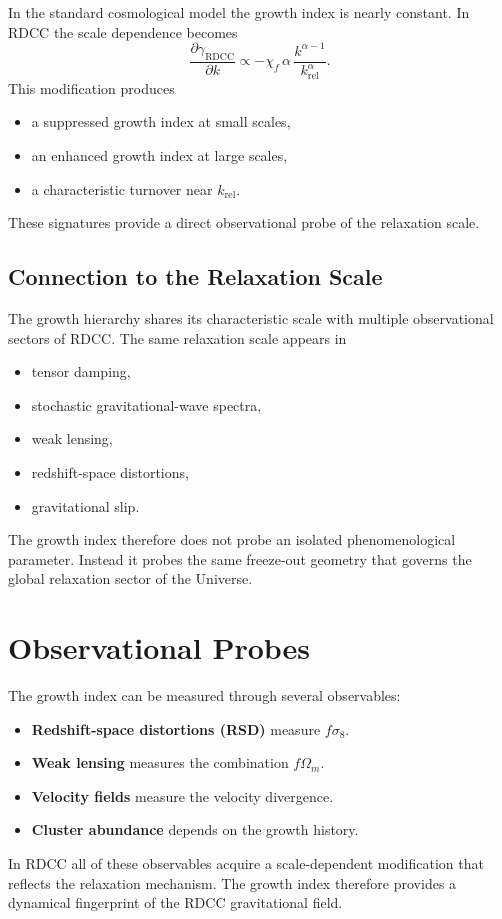 \documentclass[11pt,a4paper]{article}
\begin{document}
In the standard cosmological model the growth index is nearly constant. In
RDCC the scale dependence becomes
\begin{equation}
  \frac{\partial \gamma_{\mathrm{RDCC}}}{\partial k}
  \propto
  -
  \chi_{f}\,
  \alpha\,
  \frac{k^{\alpha-1}}{k_{\mathrm{rel}}^{\alpha}}.
\end{equation}
This modification produces
\begin{itemize}
  \item a suppressed growth index at small scales,
  \item an enhanced growth index at large scales,
  \item a characteristic turnover near \(k_{\mathrm{rel}}\).
\end{itemize}
These signatures provide a direct observational probe of the relaxation scale.

\subsection{Connection to the Relaxation Scale}

The growth hierarchy shares its characteristic scale with multiple
observational sectors of RDCC. The same relaxation scale appears in
\begin{itemize}
  \item tensor damping,
  \item stochastic gravitational-wave spectra,
  \item weak lensing,
  \item redshift-space distortions,
  \item gravitational slip.
\end{itemize}
The growth index therefore does not probe an isolated phenomenological
parameter. Instead it probes the same freeze-out geometry that governs the
global relaxation sector of the Universe.

\section{Observational Probes}

The growth index can be measured through several observables:
\begin{itemize}
  \item \textbf{Redshift-space distortions (RSD)} measure \(f\sigma_{8}\).
  \item \textbf{Weak lensing} measures the combination \(f\Omega_{m}\).
  \item \textbf{Velocity fields} measure the velocity divergence.
  \item \textbf{Cluster abundance} depends on the growth history.
\end{itemize}
In RDCC all of these observables acquire a scale-dependent modification that
reflects the relaxation mechanism. The growth index therefore provides a
dynamical fingerprint of the RDCC gravitational field.
\end{document}
